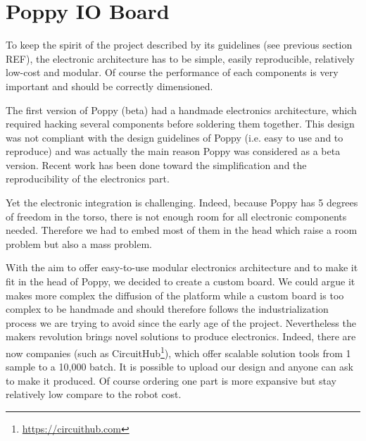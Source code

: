 







\section{Poppy IO Board} %

To keep the spirit of the project described by its guidelines (see previous section REF), the electronic architecture has to be simple, easily reproducible, relatively low-cost and modular. Of course the performance of each components is very important and should be correctly dimensioned.

The first version of Poppy (beta) had a handmade electronics architecture, which required hacking several components before soldering them together. This design was not compliant with the design guidelines of Poppy (i.e. easy to use and to reproduce) and was actually the main reason Poppy was considered as a beta version. Recent work has been done toward the simplification and the reproducibility of the electronics part.

Yet the electronic integration is challenging. Indeed, because Poppy has 5 degrees of freedom in the torso, there is not enough room for all electronic components needed. Therefore we had to embed most of them in the head which raise a room problem but also a mass problem.

With the aim to offer easy-to-use modular electronics architecture and to make it fit in the head of Poppy, we decided to create a custom board. We could argue it makes more complex the diffusion of the platform while a custom board is too complex to be handmade and should therefore follows the industrialization process we are trying to avoid since the early age of the project. Nevertheless the makers revolution brings novel solutions to produce electronics. Indeed, there are now companies (such as CircuitHub\footnote{\url{https://circuithub.com}}), which offer scalable solution tools from 1 sample to a 10,000 batch. It is possible to upload our design and anyone can ask to make it produced. Of course ordering one part is more expansive but stay relatively low compare to the robot cost.

